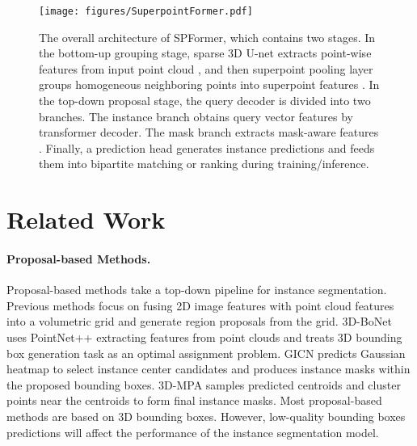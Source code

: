 \documentclass[letterpaper]{article} \usepackage{aaai23}  \usepackage{times}  \usepackage{helvet}  \usepackage{courier}  \usepackage[hyphens]{url}  \usepackage{graphicx} \urlstyle{rm} \def\UrlFont{\rm}  \usepackage{natbib}  \usepackage{caption} \frenchspacing  \setlength{\pdfpagewidth}{8.5in}  \setlength{\pdfpageheight}{11in}  \usepackage{algorithm}
\begin{document}
\begin{figure*}[htbp]
    \centering
    \texttt{[image: figures/SuperpointFormer.pdf]}
    \caption{The overall architecture of SPFormer, which contains two stages. In the bottom-up grouping stage, sparse 3D U-net extracts point-wise features from input point cloud , and then superpoint pooling layer groups homogeneous neighboring points into superpoint features . In the top-down proposal stage, the query decoder is divided into two branches. The instance branch obtains query vector features  by transformer decoder. The mask branch extracts mask-aware features . Finally, a prediction head generates instance predictions and feeds them into bipartite matching or ranking during training/inference. }
    \label{fig:superpointformer}
\end{figure*}

\section{Related Work}
\label{sec:relwork}

\paragraph{Proposal-based Methods.} Proposal-based methods take a top-down pipeline for instance segmentation. Previous methods \cite{gspn,3d-sis,panopticfusion} focus on fusing 2D image features with point cloud features into a volumetric grid and generate region proposals from the grid. 3D-BoNet \cite{3dbonet} uses PointNet++ \cite{pointnet,pointnet++} extracting features from point clouds and treats 3D bounding box generation task as an optimal assignment problem. GICN \cite{gicn} predicts Gaussian heatmap to select instance center candidates and produces instance masks within the proposed bounding boxes. 3D-MPA \cite{3d-mpa} samples predicted centroids and cluster points near the centroids to form final instance masks. Most proposal-based methods are based on 3D bounding boxes. However, low-quality bounding boxes predictions will affect the performance of the instance segmentation model.
\end{document}
